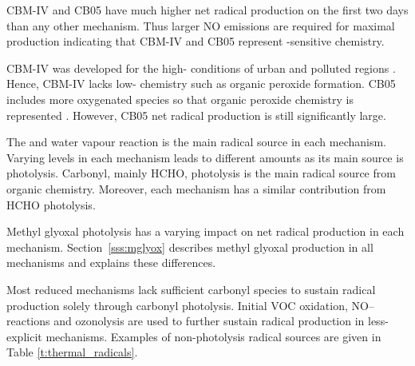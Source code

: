 CBM-IV and CB05 have much higher net radical production on the first two days than any other mechanism.
Thus larger NO emissions are required for maximal  production indicating that CBM-IV and CB05 represent -sensitive chemistry.

CBM-IV was developed for the high- conditions of urban and polluted regions \citep{Gery:1989}.
Hence, CBM-IV lacks low- chemistry such as organic peroxide formation.
CB05 includes more oxygenated species so that organic peroxide chemistry is represented \citep{Yarwood:2005}.
However, CB05 net radical production is still significantly large.

The  and water vapour reaction is the main radical source in each mechanism.
Varying  levels in each mechanism leads to different  amounts as its main source is  photolysis.
Carbonyl, mainly HCHO, photolysis is the main radical source from organic chemistry.
Moreover, each mechanism has a similar contribution from HCHO photolysis.

Methyl glyoxal photolysis has a varying impact on net radical production in each mechanism.
\mbox{Section \ref{sss:mglyox}} describes methyl glyoxal production in all mechanisms and explains these differences.

Most reduced mechanisms lack sufficient carbonyl species to sustain radical production solely through carbonyl photolysis.
Initial VOC oxidation, NO-- reactions and ozonolysis are used to further sustain radical production in less-explicit mechanisms.
Examples of non-photolysis radical sources are given in Table \ref{t:thermal_radicals}.

